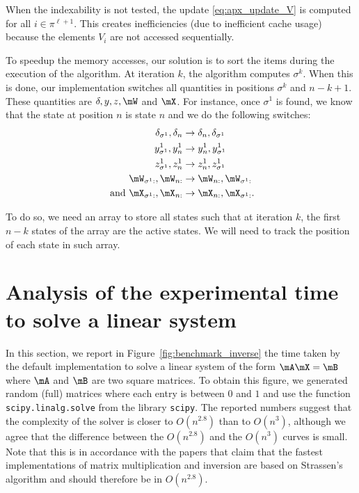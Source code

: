 When the indexability is not tested, the update \eqref{eq:apx_update_V} is computed for all $i\in\pi^{\ell+1}$. This creates inefficiencies (due to  inefficient cache usage) because the elements $V_{i}$ are not accessed sequentially.

To speedup the memory accesses, our solution is to sort the items during the execution of the algorithm. At iteration $k$, the algorithm computes $\sigma^{k}$. When this is done, our implementation switches all quantities in positions $\sigma^{k}$ and $n-k+1$. These quantities are $\delta, y, z, \mW$ and $\mX$. For instance, once $\sigma^1$ is found, we know that the state at position $n$ is state $n$ and we do the following switches:
\begin{align*}
    \delta_{\sigma^1}, \delta_{n} &\rightarrow \delta_{n}, \delta_{\sigma^1} \\
    y^1_{\sigma^1}, y^1_{n} &\rightarrow y^1_{n}, y^1_{\sigma^1} \\
    z^1_{\sigma^1}, z^1_{n} &\rightarrow z^1_{n}, z^1_{\sigma^1} \\
    \mW_{\sigma^1 :}, \mW_{n :} &\rightarrow \mW_{n:}, \mW_{\sigma^1:} \\
    \text{ and } \mX_{\sigma^1 :}, \mX_{n :} &\rightarrow \mX_{n :}, \mX_{\sigma^1 :}.
\end{align*}

To do so, we need an array to store all states such that at iteration $k$, the first $n-k$ states of the array are the active states. We will need to track the position of each state in such array.

\section{Analysis of the experimental time to solve a linear system}
\label{apx:inversion}

In this section, we report in Figure~\ref{fig:benchmark_inverse} the time taken by the default implementation to solve a linear system of the form $\mA\mX=\mB$ where $\mA$ and $\mB$ are two square matrices. To obtain this figure, we generated random (full) matrices where each entry is between $0$ and $1$ and use the function  \texttt{scipy.linalg.solve} from the library \texttt{scipy}. The reported numbers suggest that the complexity of the solver is closer to $O(n^{2.8})$ than to $O(n^3)$, although we agree that the difference between the $O(n^{2.8})$ and the $O(n^3)$ curves is small. Note that this is in accordance with the papers \cite{huang2016strassen,huang2018practical} that claim that the fastest implementations of matrix multiplication and inversion are based on Strassen's algorithm and should therefore be in $O(n^{2.8})$. 

